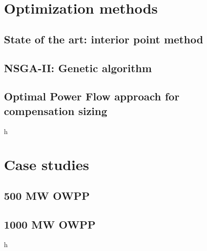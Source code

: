 \documentclass[a4paper,11pt, titlepage, twoside]{article}
\begin{document}
\section{Optimization methods}\label{Optimization}

\subsection{State of the art: interior point method}
\subsection{NSGA-II: Genetic algorithm}
\subsection{Optimal Power Flow approach for compensation sizing}
h
\section{Case studies}\label{CaseStudies}

\subsection{500 MW OWPP}
\subsection{1000 MW OWPP}
h
\end{document}
